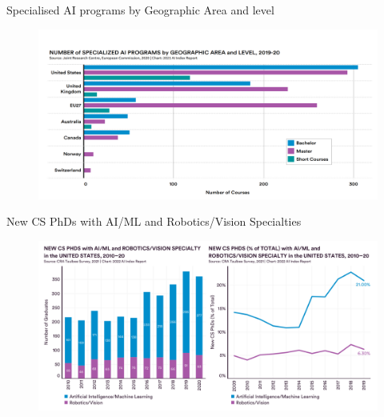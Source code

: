 {

\begin{frame}{Specialised AI programs by Geographic Area and level}

\begin{figure}
 \centering
 \includegraphics[width=1.0\textwidth]{./figures/progress-of-air-a0/outputs/drawing-v00.png}
\end{figure}

\end{frame}
}

{

\begin{frame}{New CS PhDs with AI/ML and Robotics/Vision Specialties}

\begin{figure}
 \centering
 \includegraphics[width=1.0\textwidth]{./figures/progress-of-air-a1/outputs/drawing-v00.png}
\end{figure}

\end{frame}
}



